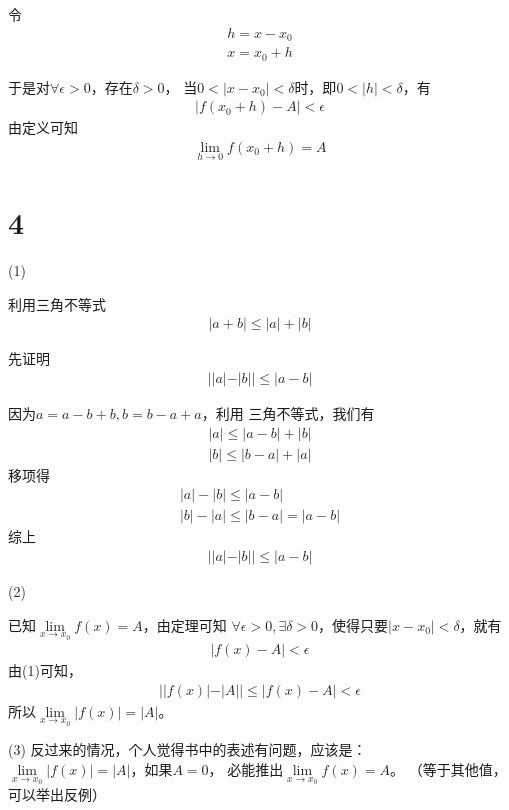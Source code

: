 \documentclass{article}
\begin{document}
令
\begin{align*}
  h = x - x_0 \\
  x = x_0 + h
\end{align*}

于是对$\forall \epsilon > 0$，存在$\delta > 0$，
当$0 < |x - x_0| < \delta$时，即$0 < |h| < \delta$，有
\begin{align*}
  |f(x_0 + h) - A| < \epsilon
\end{align*}
由定义可知
\begin{align*}
  \lim\limits_{h \to 0} f(x_0 + h) = A
\end{align*}

\section*{4}

 (1)

利用三角不等式
\begin{align*}
  |a + b| \leq |a| + |b|
\end{align*}

先证明
\begin{align*}
  ||a| - |b|| \leq |a - b|
\end{align*}

因为$a = a - b + b, b = b - a + a$，利用
三角不等式，我们有
\begin{align*}
  |a| \leq |a - b| + |b| \\
  |b| \leq |b - a| + |a|
\end{align*}
移项得
\begin{align*}
  |a| - |b| \leq |a - b| \\
  |b| - |a| \leq |b - a| = |a - b|
\end{align*}
综上
\begin{align*}
  ||a| - |b|| \leq |a - b|
\end{align*}

(2)

已知$\lim\limits_{x \to x_0} f(x) = A$，由定理可知
$\forall \epsilon > 0, \exists \delta > 0$，使得只要$|x - x_0| < \delta$，就有
\begin{align*}
  |f(x) - A| < \epsilon
\end{align*}
由(1)可知，
\begin{align*}
  ||f(x)| - |A|| \leq |f(x) - A| < \epsilon
\end{align*}
所以$\lim\limits_{x \to x_0} |f(x)| = |A|$。

(3) 反过来的情况，个人觉得书中的表述有问题，应该是：\\
$\lim\limits_{x \to x_0} |f(x)| = |A|$，如果$A = 0$，
必能推出$\lim\limits_{x \to x_0} f(x) = A$。
（等于其他值，可以举出反例）
\end{document}
